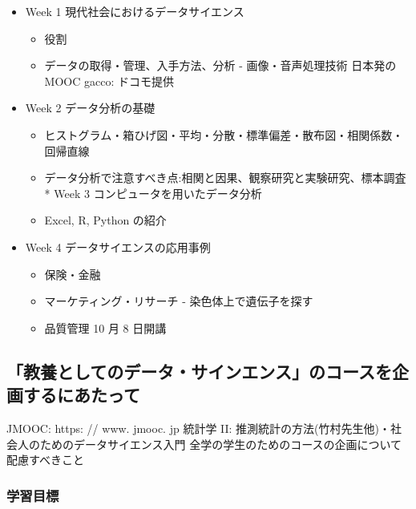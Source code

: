 \documentclass[
]{book}
\providecommand{\tightlist}{%
  \setlength{\itemsep}{0pt}\setlength{\parskip}{0pt}}
\theoremstyle{definition}
\theoremstyle{definition}
\theoremstyle{definition}
\theoremstyle{definition}
\theoremstyle{remark}
\begin{document}
\begin{itemize}
\tightlist
\item
  Week 1 現代社会におけるデータサイエンス

  \begin{itemize}
  \tightlist
  \item
    役割
  \item
    データの取得・管理、入手方法、分析 - 画像・音声処理技術
    日本発の MOOC gacco: ドコモ提供
  \end{itemize}
\item
  Week 2 データ分析の基礎

  \begin{itemize}
  \tightlist
  \item
    ヒストグラム・箱ひげ図・平均・分散・標準偏差・散布図・相関係数・回帰直線
  \item
    データ分析で注意すべき点:相関と因果、観察研究と実験研究、標本調査 * Week 3 コンピュータを用いたデータ分析
  \item
    Excel, R, Python の紹介
  \end{itemize}
\item
  Week 4 データサイエンスの応用事例

  \begin{itemize}
  \tightlist
  \item
    保険・金融
  \item
    マーケティング・リサーチ - 染色体上で遺伝子を探す
  \item
    品質管理
    10 月 8 日開講
  \end{itemize}
\end{itemize}

\hypertarget{ux6559ux990aux3068ux3057ux3066ux306eux30c7ux30fcux30bfux30b5ux30a4ux30f3ux30a8ux30f3ux30b9ux306eux30b3ux30fcux30b9ux3092ux4f01ux753bux3059ux308bux306bux3042ux305fux3063ux3066}{%
\subsection{「教養としてのデータ・サインエンス」のコースを企画するにあたって}\label{ux6559ux990aux3068ux3057ux3066ux306eux30c7ux30fcux30bfux30b5ux30a4ux30f3ux30a8ux30f3ux30b9ux306eux30b3ux30fcux30b9ux3092ux4f01ux753bux3059ux308bux306bux3042ux305fux3063ux3066}}

JMOOC: https: // www. jmooc. jp
統計学 II: 推測統計の方法(竹村先生他)・社会人のためのデータサイエンス入門
全学の学生のためのコースの企画について
配慮すべきこと

\hypertarget{ux5b66ux7fd2ux76eeux6a19}{%
\subsubsection{学習目標}\label{ux5b66ux7fd2ux76eeux6a19}}
\end{document}
